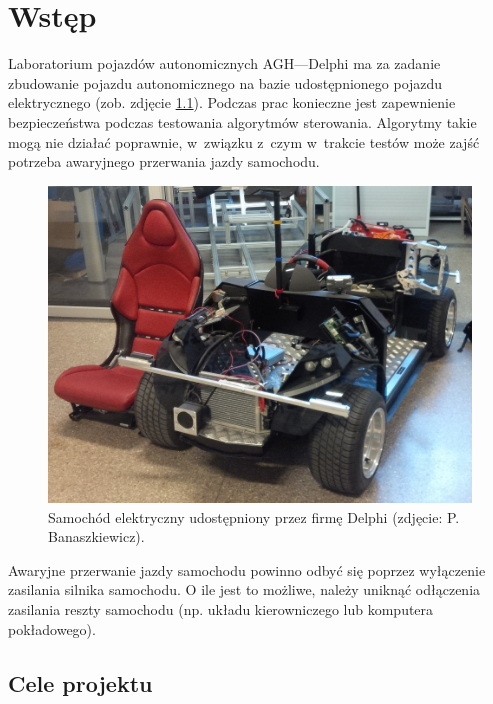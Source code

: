 \chapter{Wstęp}
\label{cha:wstep}

Laboratorium pojazdów autonomicznych AGH—Delphi ma za zadanie zbudowanie pojazdu autonomicznego na bazie udostępnionego pojazdu elektrycznego (zob. zdjęcie \ref{fig:electric_vehicle}). Podczas prac konieczne jest zapewnienie bezpieczeństwa podczas testowania algorytmów sterowania. Algorytmy takie mogą nie działać poprawnie, w~związku z~czym w~trakcie testów może zajść potrzeba awaryjnego przerwania jazdy samochodu.

\begin{figure}[h]
	\centering
	\includegraphics[scale=0.4]{pics/electric_vehicle_scaled.jpg}
	\caption{\label{fig:electric_vehicle}Samochód elektryczny udostępniony przez firmę Delphi (zdjęcie: P. Banaszkiewicz).}
\end{figure}

Awaryjne przerwanie jazdy samochodu powinno odbyć się poprzez wyłączenie zasilania silnika samochodu. O ile jest to możliwe, należy uniknąć odłączenia zasilania reszty samochodu (np. układu kierowniczego lub komputera pokładowego).


\section{Cele projektu}
\label{sec:cele_projektu}

